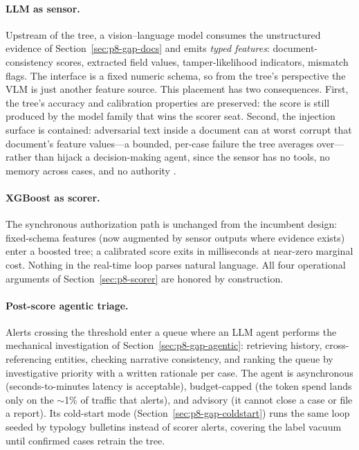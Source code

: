 \documentclass{article}
\providecommand{\secref}[1]{Section~\ref{#1}}
\begin{document}
\paragraph{LLM as sensor.} Upstream of the tree, a vision--language model
consumes the unstructured evidence of \secref{sec:p8-gap-docs} and emits
\emph{typed features}: document-consistency scores, extracted field values,
tamper-likelihood indicators, mismatch flags. The interface is a fixed numeric
schema, so from the tree's perspective the VLM is just another feature source.
This placement has two consequences. First, the tree's accuracy and
calibration properties are preserved: the score is still produced by the model
family that wins the scorer seat. Second, the injection surface is contained:
adversarial text inside a document can at worst corrupt that document's
feature values---a bounded, per-case failure the tree averages over---rather
than hijack a decision-making agent, since the sensor has no tools, no memory
across cases, and no authority \citep{greshake2023injection}.

\paragraph{XGBoost as scorer.} The synchronous authorization path is unchanged
from the incumbent design: fixed-schema features (now augmented by sensor
outputs where evidence exists) enter a boosted tree; a calibrated score exits
in milliseconds at near-zero marginal cost. Nothing in the real-time loop
parses natural language. All four operational arguments of
\secref{sec:p8-scorer} are honored by construction.

\paragraph{Post-score agentic triage.} Alerts crossing the threshold enter a
queue where an LLM agent performs the mechanical investigation of
\secref{sec:p8-gap-agentic}: retrieving history, cross-referencing entities,
checking narrative consistency, and ranking the queue by investigative
priority with a written rationale per case. The agent is asynchronous
(seconds-to-minutes latency is acceptable), budget-capped (the token spend
lands only on the $\sim$1\% of traffic that alerts), and advisory (it cannot
close a case or file a report). Its cold-start mode (\secref{sec:p8-gap-coldstart})
runs the same loop seeded by typology bulletins instead of scorer alerts,
covering the label vacuum until confirmed cases retrain the tree.
\end{document}
